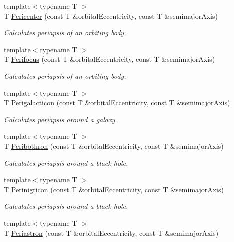 \begin{DoxyCompactItemize}
{\footnotesize template$<$typename T $>$ }\\T \hyperlink{group___periapsis_gac4c419a87a5802cf6afc98f50792e99f}{Pericenter} (const T \&orbital\+Eccentricity, const T \&semimajor\+Axis)
\begin{DoxyCompactList}\small\item\em Calculates periapsis of an orbiting body. \end{DoxyCompactList}\item 
{\footnotesize template$<$typename T $>$ }\\T \hyperlink{group___periapsis_gaff62669fb364a245cb85f9a91d8ea71f}{Perifocus} (const T \&orbital\+Eccentricity, const T \&semimajor\+Axis)
\begin{DoxyCompactList}\small\item\em Calculates periapsis of an orbiting body. \end{DoxyCompactList}\item 
{\footnotesize template$<$typename T $>$ }\\T \hyperlink{group___periapsis_ga074fecab96b90bebffa512a37e52d90b}{Perigalacticon} (const T \&orbital\+Eccentricity, const T \&semimajor\+Axis)
\begin{DoxyCompactList}\small\item\em Calculates periapsis around a galaxy. \end{DoxyCompactList}\item 
{\footnotesize template$<$typename T $>$ }\\T \hyperlink{group___periapsis_gada5892309279a3a687c4eb2f88238e4e}{Peribothron} (const T \&orbital\+Eccentricity, const T \&semimajor\+Axis)
\begin{DoxyCompactList}\small\item\em Calculates periapsis around a black hole. \end{DoxyCompactList}\item 
{\footnotesize template$<$typename T $>$ }\\T \hyperlink{group___periapsis_ga99d86af90179994e17158b082c502fd4}{Perinigricon} (const T \&orbital\+Eccentricity, const T \&semimajor\+Axis)
\begin{DoxyCompactList}\small\item\em Calculates periapsis around a black hole. \end{DoxyCompactList}\item 
{\footnotesize template$<$typename T $>$ }\\T \hyperlink{group___periapsis_ga477de6824cbb5986cdae923141e21648}{Periastron} (const T \&orbital\+Eccentricity, const T \&semimajor\+Axis)

\end{DoxyCompactItemize}
